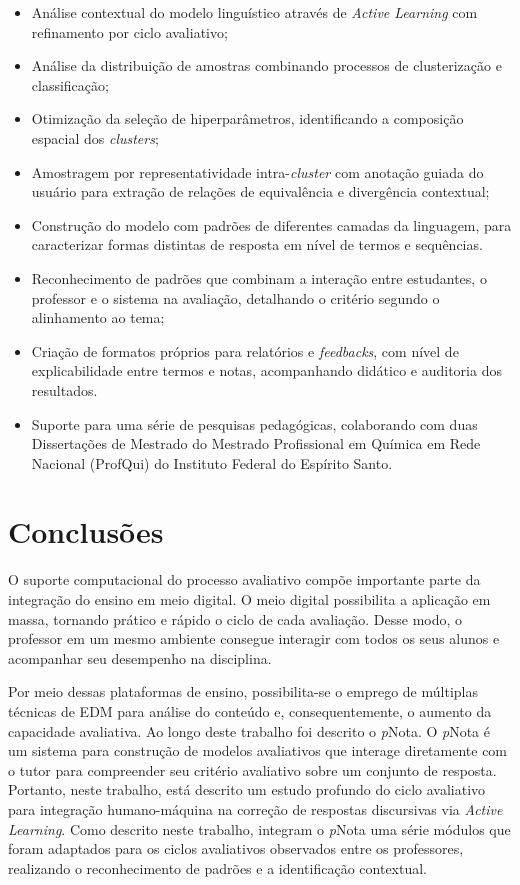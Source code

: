 \begin{itemize}
  \item Análise contextual do modelo linguístico através de \textit{Active Learning} com refinamento por ciclo avaliativo;
  \item Análise da distribuição de amostras combinando processos de clusterização e classificação;
  \item Otimização da seleção de hiperparâmetros, identificando a composição espacial dos \textit{clusters};
  \item Amostragem por representatividade intra-\textit{cluster} com anotação guiada do usuário para extração de relações de equivalência e divergência contextual;
  \item Construção do modelo com padrões de diferentes camadas da linguagem, para caracterizar formas distintas de resposta em nível de termos e sequências.
  \item Reconhecimento de padrões que combinam a interação entre estudantes, o professor e o sistema na avaliação, detalhando o critério segundo o alinhamento ao tema;
  \item Criação de formatos próprios para relatórios e \textit{feedbacks}, com nível de explicabilidade entre termos e notas, acompanhando didático e auditoria dos resultados.
  \item Suporte para uma série de pesquisas pedagógicas, colaborando com duas Dissertações de Mestrado do Mestrado Profissional em Química em Rede Nacional (ProfQui) do Instituto Federal do Espírito Santo.


\end{itemize}

\newpage

\section{Conclusões}

O suporte computacional do processo avaliativo compõe importante parte da integração do ensino em meio digital. O meio digital possibilita a aplicação em massa, tornando prático e rápido o ciclo de cada avaliação. Desse modo, o professor em um mesmo ambiente consegue interagir com todos os seus alunos e acompanhar seu desempenho na disciplina. 

Por meio dessas plataformas de ensino, possibilita-se o emprego de múltiplas técnicas de EDM para análise do conteúdo e, consequentemente, o aumento da capacidade avaliativa. Ao longo deste trabalho foi descrito o \textit{p}Nota. O \textit{p}Nota é um sistema para construção de modelos avaliativos que interage diretamente com o tutor para compreender seu critério avaliativo sobre um conjunto de resposta. Portanto, neste trabalho, está descrito um estudo profundo do ciclo avaliativo para integração humano-máquina na correção de respostas discursivas via \textit{Active Learning}. Como descrito neste trabalho, integram o \textit{p}Nota uma série módulos que foram adaptados para os ciclos avaliativos observados entre os professores, realizando o reconhecimento de padrões e a identificação contextual.

